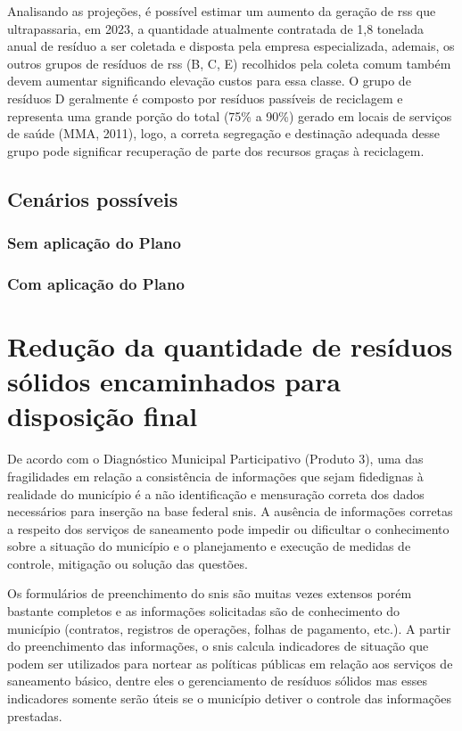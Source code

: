 Analisando as projeções, é possível estimar um aumento da geração de \gls{rss} que ultrapassaria, em 2023, a quantidade atualmente contratada de 1,8 tonelada anual de resíduo a ser coletada e disposta pela empresa especializada, ademais, os outros grupos de resíduos de \gls{rss} (B, C, E) recolhidos pela coleta comum também devem aumentar significando elevação custos para essa classe. O grupo de resíduos D geralmente é composto por resíduos passíveis de reciclagem e representa uma grande porção do total (75\% a 90\%) gerado em locais de serviços de saúde (MMA, 2011), logo, a correta segregação e destinação adequada desse grupo pode significar recuperação de parte dos recursos graças à reciclagem.   

\subsection{Cenários possíveis}

\subsubsection{Sem aplicação do Plano}

\subsubsection{Com aplicação do Plano}	

\section{Redução da quantidade de resíduos sólidos encaminhados para disposição final}

De acordo com o Diagnóstico Municipal Participativo (Produto 3), uma das fragilidades em relação a consistência de informações que sejam fidedignas à realidade do município é a não identificação e mensuração correta dos dados necessários para inserção na base federal \gls{snis}. A ausência de informações corretas a respeito dos serviços de saneamento pode impedir ou dificultar o conhecimento sobre a situação do município e o planejamento e execução de medidas de controle, mitigação ou solução das questões.

Os formulários de preenchimento do \gls{snis} são muitas vezes extensos porém bastante completos e as informações solicitadas são de conhecimento do município (contratos, registros de operações, folhas de pagamento, etc.).	A partir do preenchimento das informações, o \gls{snis} calcula indicadores de situação que podem ser utilizados para nortear as políticas públicas em relação aos serviços de saneamento básico, dentre eles o gerenciamento de resíduos sólidos mas esses indicadores somente serão úteis se o município detiver o controle das informações prestadas. 


